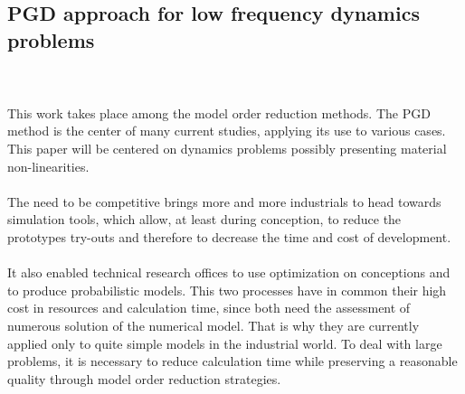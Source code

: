 \documentclass[12pt,a4paper]{article}
\begin{document}
\begin{center}
\section*{PGD approach for low frequency dynamics problems}



\end{center}

\\	

\paragraph*{}
This work takes place among the model order reduction methods. The PGD method is the center of many current studies, applying its use to various cases. This paper will be centered on dynamics problems possibly presenting material non-linearities.
\paragraph*{}
The need to be competitive brings more and more industrials to head towards simulation tools, which allow, at least during conception, to reduce the prototypes try-outs and therefore to decrease the time and cost of development.
\paragraph*{}
It also enabled technical research offices to use optimization on conceptions and to produce probabilistic models. This two processes have in common their high cost in resources and calculation time, since both need the assessment of numerous solution of the numerical model. That is why they are currently applied only to quite simple models in the industrial world. To deal with large problems, it is necessary to reduce calculation time while preserving a reasonable quality through model order reduction strategies.
\end{document}
